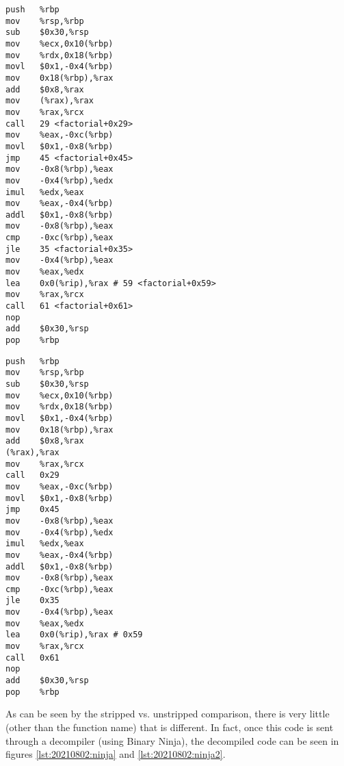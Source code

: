 \begin{minipage}{.45\textwidth}
\begin{lstlisting}[caption={Unstripped Machine Code},captionpos=b,style=CStyle,basicstyle=\small,label={lst:20210802:machine}]
push   %rbp
mov    %rsp,%rbp
sub    $0x30,%rsp
mov    %ecx,0x10(%rbp)
mov    %rdx,0x18(%rbp)
movl   $0x1,-0x4(%rbp)
mov    0x18(%rbp),%rax
add    $0x8,%rax
mov    (%rax),%rax
mov    %rax,%rcx
call   29 <factorial+0x29>
mov    %eax,-0xc(%rbp)
movl   $0x1,-0x8(%rbp)
jmp    45 <factorial+0x45>
mov    -0x8(%rbp),%eax
mov    -0x4(%rbp),%edx
imul   %edx,%eax
mov    %eax,-0x4(%rbp)
addl   $0x1,-0x8(%rbp)
mov    -0x8(%rbp),%eax
cmp    -0xc(%rbp),%eax
jle    35 <factorial+0x35>
mov    -0x4(%rbp),%eax
mov    %eax,%edx
lea    0x0(%rip),%rax # 59 <factorial+0x59>
mov    %rax,%rcx
call   61 <factorial+0x61>
nop
add    $0x30,%rsp
pop    %rbp
\end{lstlisting}
\end{minipage}
\begin{minipage}{.45\textwidth}
\begin{lstlisting}[caption={Stripped Machine Code},captionpos=b,style=CStyle,basicstyle=\small,label={lst:20210802:machine2}]
push   %rbp
mov    %rsp,%rbp
sub    $0x30,%rsp
mov    %ecx,0x10(%rbp)
mov    %rdx,0x18(%rbp)
movl   $0x1,-0x4(%rbp)
mov    0x18(%rbp),%rax
add    $0x8,%rax
(%rax),%rax
mov    %rax,%rcx
call   0x29
mov    %eax,-0xc(%rbp)
movl   $0x1,-0x8(%rbp)
jmp    0x45
mov    -0x8(%rbp),%eax
mov    -0x4(%rbp),%edx
imul   %edx,%eax
mov    %eax,-0x4(%rbp)
addl   $0x1,-0x8(%rbp)
mov    -0x8(%rbp),%eax
cmp    -0xc(%rbp),%eax
jle    0x35
mov    -0x4(%rbp),%eax
mov    %eax,%edx
lea    0x0(%rip),%rax # 0x59
mov    %rax,%rcx
call   0x61
nop
add    $0x30,%rsp
pop    %rbp
\end{lstlisting}
\end{minipage}

As can be seen by the stripped vs. unstripped comparison, there is very little (other than the function name) that is different. In fact, once this code is sent through a decompiler (using Binary Ninja), the decompiled code can be seen in figures \ref{lst:20210802:ninja} and \ref{lst:20210802:ninja2}.

